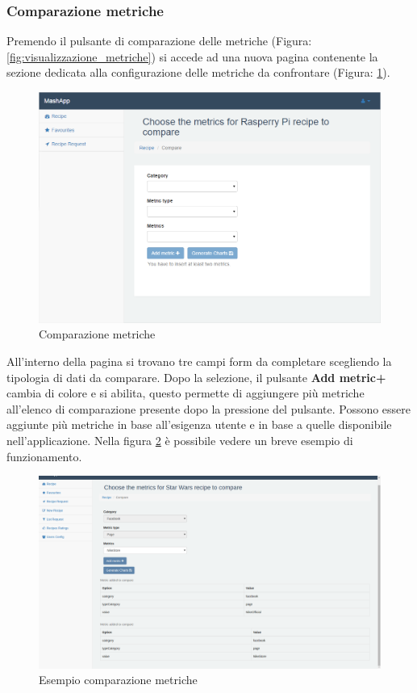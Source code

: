 		\subsubsection{Comparazione metriche} %
		\label{sec:comparazione_metriche}
			Premendo il pulsante di comparazione delle metriche (Figura: \ref{fig:visualizzazione_metriche}) si accede ad una nuova pagina contenente la sezione dedicata alla configurazione delle metriche da confrontare (Figura: \ref{fig:comparazione_metriche}).
			\begin{figure}[H]
				\centering
				\centerline{\includegraphics[width=14cm]{images/comparazione_metriche.png}}
				\caption{Comparazione metriche}
				\label{fig:comparazione_metriche}
			\end{figure}
			All'interno della pagina si trovano tre campi form da completare scegliendo la tipologia di dati da comparare. Dopo la selezione, il pulsante \textbf{Add metric+} cambia di colore e si abilita, questo permette di aggiungere più metriche all'elenco di comparazione presente dopo la pressione del pulsante.\newline
			Possono essere aggiunte più metriche in base all'esigenza utente e in base a quelle disponibile nell'applicazione. Nella figura \ref{fig:esempio_comparazione_metriche} è possibile vedere un breve esempio di funzionamento.
			\begin{figure}[H]
				\centering
				\centerline{\includegraphics[width=14cm]{images/esempio_comparazione_metriche.png}}
				\caption{Esempio comparazione metriche}
				\label{fig:esempio_comparazione_metriche}
			\end{figure}


